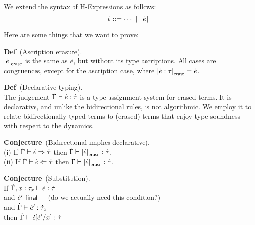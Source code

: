 \documentclass{article}
\begin{document}
%
%
%

We extend the syntax of H-Expressions as follows:
\[
\dot{e} ::= \cdots~|~\lceil\dot{e}\rceil
\]

Here are some things that we want to prove:

\textbf{Def}~(Ascription erasure). 
\\
$\left|\dot{e}\right|_\textsf{erase}$ is the same as $\dot{e}$, but without its type ascriptions.
%
All cases are congruences, except for the ascription case, where $\left|\dot{e} : \dot{\tau}\right|_\textsf{erase} = \dot{e}$.

\textbf{Def}~(Declarative typing).
\\
The judgement $\dot{\Gamma} \vdash \dot{e} : \dot{\tau}$ is a type assignment
system for erased terms.  It is declarative, and unlike the
bidirectional rules, is not algorithmic.
%
We employ it to relate bidirectionally-typed terms to (erased) terms
that enjoy type soundness with respect to the dynamics.

\textbf{Conjecture}~(Bidirectional implies declarative).
\\
(i) If $\dot{\Gamma} \vdash \dot{e} \Rightarrow \dot{\tau}$ then $\dot{\Gamma} \vdash \left|\dot{e}\right|_\textsf{erase} : \dot{\tau}$.
\\
(ii) If $\dot{\Gamma} \vdash \dot{e} \Leftarrow \dot{\tau}$ then $\dot{\Gamma} \vdash \left|\dot{e}\right|_\textsf{erase} : \dot{\tau}$.

\textbf{Conjecture}~(Substitution).
\\
If $\dot{\Gamma}, x : \tau_x \vdash \dot{e} : \dot{\tau}$
\\
and $\dot{e}'~\textsf{final}$~~~(do we actually need this condition?)
\\
and $\dot{\Gamma} \vdash \dot{e}' : \dot{\tau}_x$
\\
then $\dot{\Gamma} \vdash \dot{e}[\dot{e}' / x] : \dot{\tau}$

\end{document}
